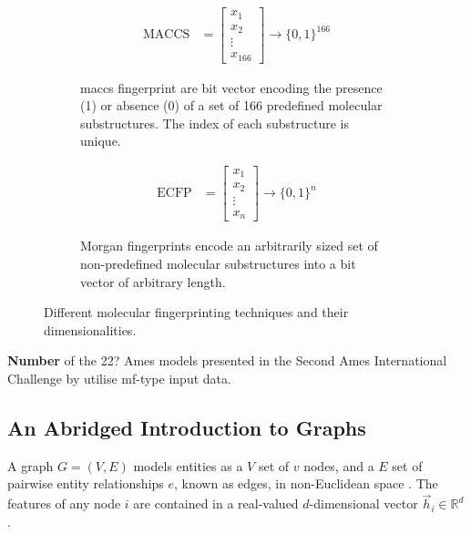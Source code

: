 \begin{figure}[H]
    \centering
    \begin{subfigure}[t]{0.48\textwidth}
        \centering
        \begin{align*}
            \text{MACCS} &= \begin{bmatrix}
               x_{1} \\
               x_{2} \\
               \vdots \\
               x_{166}
             \end{bmatrix}
            \rightarrow \{0, 1\}^{166}
        \end{align*}
        \caption{\gls{maccs} fingerprint are bit vector encoding the presence (1) or absence (0) of a set of 166 predefined molecular substructures. The index of each substructure is unique.}
        \label{fig:maccs}
    \end{subfigure}
    \hfill
    \begin{subfigure}[t]{0.48\textwidth}
        \centering
        \begin{align*}
            \text{ECFP} &= \begin{bmatrix}
               x_{1} \\
               x_{2} \\
               \vdots \\
               x_{n}
             \end{bmatrix}
            \rightarrow \{0, 1\}^n
        \end{align*}
        \caption{Morgan fingerprints encode an arbitrarily sized set of non-predefined molecular substructures into a bit vector of arbitrary length.}
        \label{fig:morgan}
    \end{subfigure}
    \caption{Different molecular fingerprinting techniques and their dimensionalities.}
\end{figure}

\textbf{Number} of the 22? Ames models presented in the Second Ames International Challenge by \textcite{furuhama_evaluation_2023} utilise \gls{mf}-type input data.

\subsection{An Abridged Introduction to Graphs}
A graph $G=(V,E)$ models entities as a $V$ set of $v$ nodes, and a $E$ set of pairwise entity relationships $e$, known as edges, in non-Euclidean space \cite{scarselli_graph_2009}. The features of any node $i$ are contained in a real-valued $d$-dimensional vector $\vec{h}_i\in\mathbb{R}^d$.

